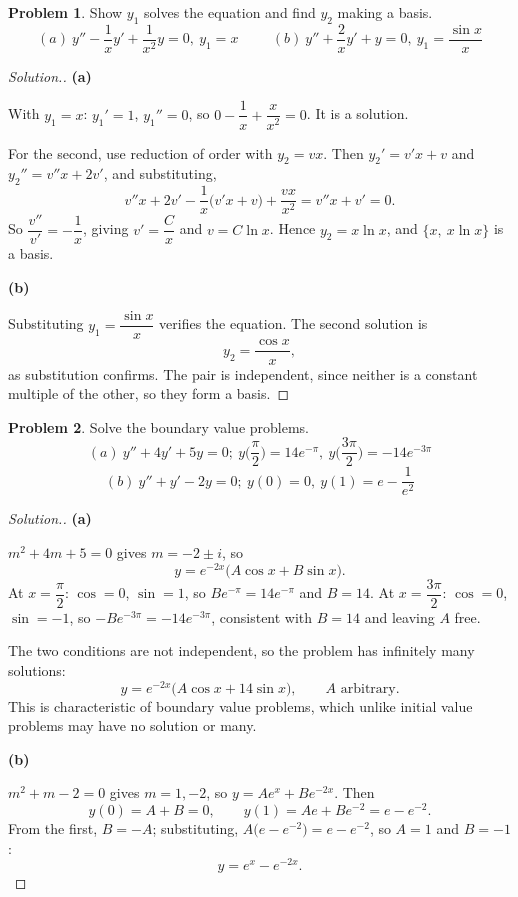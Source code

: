 \documentclass[11pt,a4paper]{article}
\theoremstyle{definition}
\newtheorem{problemx}{Problem}[subsection]
\newenvironment{problem}{\begin{problemx}}{\end{problemx}}
\newenvironment{solution}
  {\renewcommand{\qedsymbol}{}\begin{proof}[\textit{Solution}.]}
  {\end{proof}}
\newcommand{\subhead}[1]{%
  \par\medskip\noindent\textbf{#1}\par\nobreak\smallskip}
\begin{document}
\begin{problem}
Show $y_1$ solves the equation and find $y_2$ making a basis.
$$(a)\ y'' - \frac1xy' + \frac{1}{x^2}y = 0,\ y_1 = x\hspace{1cm}
(b)\ y'' + \frac2xy' + y = 0,\ y_1 = \frac{\sin x}{x}$$
\end{problem}
\begin{solution}
\subhead{(a)}
With $y_1 = x$: $y_1' = 1$, $y_1'' = 0$, so
$0 - \dfrac1x + \dfrac{x}{x^2} = 0$. It is a solution.

For the second, use reduction of order with $y_2 = vx$. Then
$y_2' = v'x+v$ and $y_2'' = v''x+2v'$, and substituting,
$$v''x + 2v' - \frac1x\big(v'x+v\big) + \frac{vx}{x^2}
= v''x + v' = 0 .$$
So $\dfrac{v''}{v'} = -\dfrac1x$, giving $v' = \dfrac{C}{x}$ and
$v = C\ln x$. Hence $y_2 = x\ln x$, and $\{x,\ x\ln x\}$ is a basis.

\subhead{(b)}
Substituting $y_1 = \dfrac{\sin x}{x}$ verifies the equation. The second
solution is
$$y_2 = \frac{\cos x}{x},$$
as substitution confirms. The pair is independent, since neither is a constant
multiple of the other, so they form a basis.
\end{solution}

\begin{problem}
Solve the boundary value problems.
$$(a)\ y''+4y'+5y = 0;\ y\Big(\frac{\pi}{2}\Big) = 14e^{-\pi},\
y\Big(\frac{3\pi}{2}\Big) = -14e^{-3\pi}$$
$$(b)\ y''+y'-2y = 0;\ y(0) = 0,\ y(1) = e - \frac{1}{e^2}$$
\end{problem}
\begin{solution}
\subhead{(a)}
$m^2+4m+5 = 0$ gives $m = -2\pm i$, so
$$y = e^{-2x}\big(A\cos x + B\sin x\big).$$
At $x = \dfrac{\pi}{2}$: $\cos = 0$, $\sin = 1$, so
$Be^{-\pi} = 14e^{-\pi}$ and $B = 14$.
At $x = \dfrac{3\pi}{2}$: $\cos = 0$, $\sin = -1$, so
$-Be^{-3\pi} = -14e^{-3\pi}$, consistent with $B = 14$ and leaving $A$ free.

The two conditions are not independent, so the problem has infinitely many
solutions:
$$y = e^{-2x}\big(A\cos x + 14\sin x\big),\qquad A \text{ arbitrary.}$$
This is characteristic of boundary value problems, which unlike initial value
problems may have no solution or many.

\subhead{(b)}
$m^2+m-2 = 0$ gives $m = 1, -2$, so $y = Ae^{x} + Be^{-2x}$. Then
$$y(0) = A+B = 0,\qquad y(1) = Ae + Be^{-2} = e - e^{-2}.$$
From the first, $B = -A$; substituting, $A\big(e - e^{-2}\big) = e - e^{-2}$, so
$A = 1$ and $B = -1$:
$$y = e^{x} - e^{-2x}.$$
\end{solution}
\end{document}
